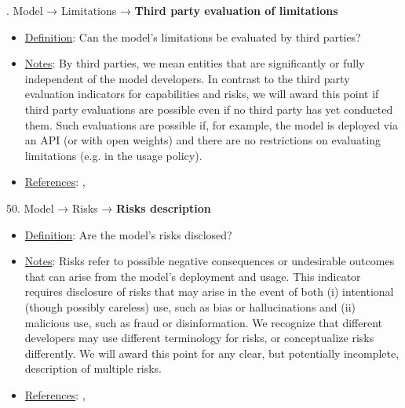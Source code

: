 . Model → Limitations → \textbf{Third party evaluation of limitations}
\vspace{-\parskip}
\begin{itemize}
\item
\underline{Definition}: Can the model’s limitations be evaluated by third parties?
\item
\underline{Notes}: By third parties, we mean entities that are significantly or fully independent of the model developers. In contrast to the third party evaluation indicators for capabilities and risks, we will award this point if third party evaluations are possible even if no third party has yet conducted them. Such evaluations are possible if, for example, the model is deployed via an API (or with open weights) and there are no restrictions on evaluating limitations (e.g. in the usage policy). 
\item
\underline{References}: \citet{raji2022audit}, \citet{liang2022helm}
\end{itemize} \vspace{\baselineskip}


50. Model → Risks → \textbf{Risks description}
\vspace{-\parskip}
\begin{itemize}
\item
\underline{Definition}: Are the model's risks disclosed?
\item
\underline{Notes}: Risks refer to possible negative consequences or undesirable outcomes that can arise from the model's deployment and usage. This indicator requires disclosure of risks that may arise in the event of both (i) intentional (though possibly careless) use, such as bias or hallucinations and (ii) malicious use, such as fraud or disinformation. We recognize that different developers may use different terminology for risks, or conceptualize risks differently. We will award this point for any clear, but potentially incomplete, description of multiple risks.
\item
\underline{References}: \citet{solaiman2023evaluating}, \citet{weidinger2021ethical}
\end{itemize} \vspace{\baselineskip}


